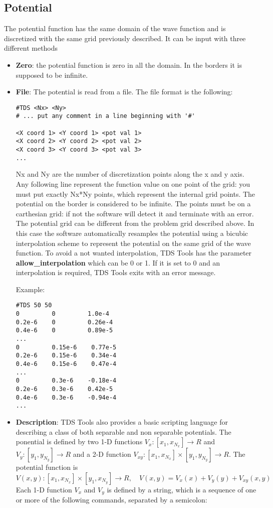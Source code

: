 \documentclass[a4paper,11pt]{article}
\begin{document}
\subsection{Potential}
The potential function has the same domain of the wave function and is discretized with the same grid previously described. It can be input with three different methods
\begin{itemize}
  \item \textbf{Zero}: the potential function is zero in all the domain. In the borders it is supposed to be infinite.
  \item \textbf{File}: The potential is read from a file. The file format is the following:

\begin{verbatim}
#TDS <Nx> <Ny>
# ... put any comment in a line beginning with '#'

<X coord 1> <Y coord 1> <pot val 1>
<X coord 2> <Y coord 2> <pot val 2>
<X coord 3> <Y coord 3> <pot val 3>
...
\end{verbatim}

Nx and Ny are the number of discretization points along the x and y axis. Any following line represent the function value on one point of the grid: you must put exactly Nx*Ny points, which represent the internal grid points. The potential on the border is considered to be infinite. The points must be on a carthesian grid: if not the software will detect it and terminate with an error.
The potential grid can be different from the problem grid described above. In this case the software automatically resamples the potential using a bicubic interpolation scheme to represent the potential on the same grid of the wave function.
To avoid a not wanted interpolation, TDS Tools has the parameter \textbf{allow\_interpolation} which can be 0 or 1. If it is set to 0 and an interpolation is required, TDS Tools exits with an error message.

Example:
\begin{verbatim}
#TDS 50 50
0         0         1.0e-4
0.2e-6    0         0.26e-4
0.4e-6    0         0.89e-5
...
0         0.15e-6    0.77e-5
0.2e-6    0.15e-6    0.34e-4
0.4e-6    0.15e-6    0.47e-4
...
0         0.3e-6    -0.18e-4
0.2e-6    0.3e-6    0.42e-5
0.4e-6    0.3e-6    -0.94e-4
...
\end{verbatim}

\item \textbf{Description}: TDS Tools also provides a basic scripting language for describing a class of both separable and non separable potentials.
The ponential is defined by two 1-D functions $V_x : [x_1, x_{N_x}] \rightarrow R$ and
$V_y : [y_1, y_{N_y}] \rightarrow R$ and a 2-D function
$V_{xy} : [x_1, x_{N_x}] \times [y_1, y_{N_y}] \rightarrow R$. The potential function is
$$V(x, y) : [x_1, x_{N_x}]\times[y_1, x_{N_y}] \rightarrow R, \quad V(x, y) = V_x(x)+V_y(y)+V_{xy}(x, y)$$
Each 1-D function $V_x$ and $V_y$ is defined by a string, which is a sequence of one or more of the following commands, separated by a semicolon:


\end{itemize}
\end{document}

